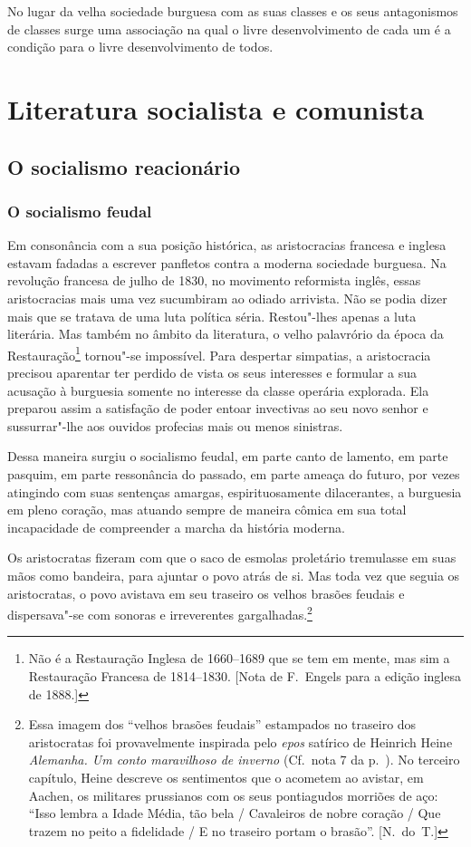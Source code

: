No lugar da velha sociedade burguesa com as suas classes e os seus
antagonismos de classes surge uma associação na qual o livre
desenvolvimento de cada um é a condição para o livre desenvolvimento de
todos.

\section{Literatura socialista e comunista}

\vspace*{1em}
\subsection{O socialismo reacionário}

\subsubsection{O socialismo feudal}
Em consonância com a sua posição histórica, as aristocracias
francesa e inglesa estavam fadadas a escrever panfletos contra a
moderna sociedade burguesa. Na revolução francesa de julho de 1830, no
movimento reformista inglês, essas aristocracias mais uma vez				
sucumbiram ao odiado arrivista. Não se podia dizer mais que se tratava
de uma luta política séria. Restou"-lhes apenas a luta literária. Mas
também no âmbito da literatura, o velho palavrório da época da
Restauração\footnote{ Não é a Restauração Inglesa de 1660--1689 que se tem em mente, mas sim a
Restauração Francesa de 1814--1830. [Nota de F.~Engels para a edição
inglesa de 1888.]}
tornou"-se impossível. Para despertar simpatias, a
aristocracia precisou aparentar ter perdido de vista os seus interesses
e formular a sua acusação à burguesia somente no interesse da
classe operária explorada. Ela preparou assim a satisfação de
poder entoar invectivas ao seu novo senhor e sussurrar"-lhe aos
ouvidos profecias mais ou menos sinistras.

Dessa maneira surgiu o socialismo feudal, em parte canto de lamento, em
parte pasquim, em parte ressonância do passado, em parte ameaça do
futuro, por vezes atingindo com suas sentenças amargas,
espirituosamente dilacerantes, a burguesia em pleno coração, mas
atuando sempre de maneira cômica em sua total incapacidade de
compreender a marcha da história moderna.

Os aristocratas fizeram com que o saco de esmolas proletário
tremulasse em suas mãos como bandeira, para ajuntar o povo atrás de si.
Mas toda vez que seguia os aristocratas, o povo avistava em seu
traseiro os velhos brasões feudais e dispersava"-se com sonoras e
irreverentes
gargalhadas.\footnote{ Essa imagem dos “velhos brasões feudais”
estampados no traseiro dos aristocratas foi provavelmente inspirada
pelo \textit{epos} satírico de Heinrich Heine\textit{ Alemanha. Um
conto maravilhoso de inverno} (Cf.~nota 7 da p.~\pageref{7}). No terceiro capítulo, Heine
descreve os sentimentos que o acometem ao avistar, em Aachen, os
militares prussianos com os seus pontiagudos morriões de aço: “Isso
lembra a Idade Média, tão bela / Cavaleiros de nobre coração / Que
trazem no peito a fidelidade / E no traseiro portam o brasão”. [N.~do~T.]}

